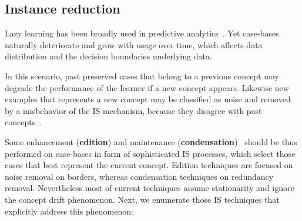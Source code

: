 \documentclass[preprint,12pt]{elsarticle}
\begin{document}
\begin{itemize}
\subsection{Instance reduction}
\label{subsec:isel}

Lazy learning has been broadly used in predictive analytics~\cite{cover67}. Yet case-bases naturally deteriorate and grow with usage over time, which affects data distribution and the decision boundaries underlying data.

In this scenario, past preserved cases that belong to a previous concept may degrade the performance of the learner if a new concept appears. Likewise new examples that represents a new concept may be classified as noise and removed by a misbehavior of the IS mechanism, because they disagree with past concepts~\cite{lu16}. 

Some enhancement (\textbf{edition}) and maintenance (\textbf{condensation})~\cite{garcia14} should be thus performed on case-bases in form of sophisticated IS processes, which select those cases that best represent the current concept. Edition techniques are focused on noise removal on borders, whereas condensation techniques on redundancy removal. Nevertheless most of current techniques assume stationarity and ignore the concept drift phenomenon. Next, we enumerate those IS techniques that explicitly address this phenomenon:


\end{itemize}
\end{document}
